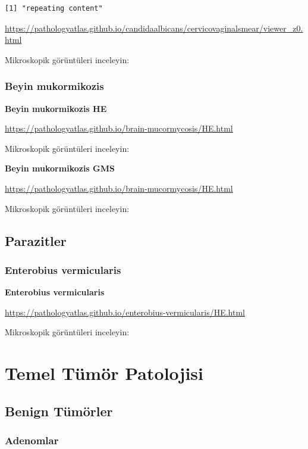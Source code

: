 \documentclass[
  letterpaper,
  DIV=11,
  numbers=noendperiod]{scrreprt}
\begin{document}
\begin{verbatim}
[1] "repeating content"
\end{verbatim}

\url{https://pathologyatlas.github.io/candidaalbicans/cervicovaginalsmear/viewer_z0.html}

Mikroskopik görüntüleri inceleyin:

\hypertarget{beyin-mukormikozis}{%
\section{Beyin mukormikozis}\label{beyin-mukormikozis}}

\textbf{Beyin mukormikozis HE}

\url{https://pathologyatlas.github.io/brain-mucormycosis/HE.html}

Mikroskopik görüntüleri inceleyin:

\textbf{Beyin mukormikozis GMS}

\url{https://pathologyatlas.github.io/brain-mucormycosis/HE.html}

Mikroskopik görüntüleri inceleyin:

\hypertarget{parazitler}{%
\chapter{Parazitler}\label{parazitler}}

\hypertarget{enterobius-vermicularis}{%
\section{Enterobius vermicularis}\label{enterobius-vermicularis}}

\textbf{Enterobius vermicularis}

\url{https://pathologyatlas.github.io/enterobius-vermicularis/HE.html}

Mikroskopik görüntüleri inceleyin:

\part{Temel Tümör Patolojisi}

\hypertarget{benign-tuxfcmuxf6rler}{%
\chapter{Benign Tümörler}\label{benign-tuxfcmuxf6rler}}

\hypertarget{adenomlar}{%
\section{Adenomlar}\label{adenomlar}}
\end{document}

